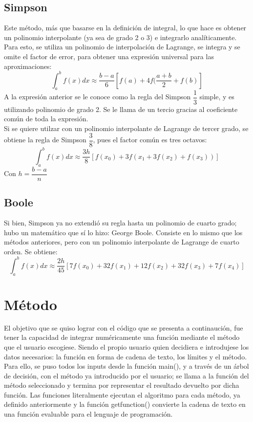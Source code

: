\documentclass[12pt,oneside,FLEQN]{report}
\begin{document}
{	\section{Simpson}
		Este método, más que basarse en la definición de integral, lo que hace es obtener un polinomio interpolante (ya sea de grado 2 o 3) e integrarlo analíticamente. Para esto, se utiliza un polinomio de interpolación de Lagrange, se integra y se omite el factor de error, para obtener una expresión universal para las aproximaciones:
		\begin{equation}
			\int_{a}^{b}f(x)dx\approx\dfrac{b-a}{6}\left[f(a)+4f(\dfrac{a+b}{2}+f(b)\right]
		\end{equation}
		A la expresión anterior se le conoce como la regla del Simpson $\dfrac{1}{3}$ simple, y es utilizando polinomio de grado 2. Se le llama de un tercio gracias al coeficiente común de toda la expresión.\\

		Si se quiere utilzar con un polinomio interpolante de Lagrange de tercer grado, se obtiene la regla de Simpson $\dfrac{3}{8}$, pues el factor común es tres octavos:
		\begin{equation}
			\int_{a}^{b}f(x)dx\approx\dfrac{3h}{8}\left[f(x_{0})+3f(x_{1}+3f(x_{2})+f(x_{3}))\right]
		\end{equation}
		Con $h=\dfrac{b-a}{n}$ 
	\section{Boole}
		Si bien, Simpson ya no extendió su regla hasta un polinomio de cuarto grado; hubo un matemático que sí lo hizo: George Boole. Consiste en lo mismo que los métodos anteriores, pero con un polinomio interpolante de Lagrange de cuarto orden. Se obtiene:
		\begin{equation}
			\int_{a}^{b}f(x)dx\approx\dfrac{2h}{45}\left[7f(x_{0})+32f(x_{1})+12f(x_{2})+32f(x_{3})+7f(x_{4})\right]
		\end{equation}

\chapter{Método}
	El objetivo que se quiso lograr con el código que se presenta a continaución, fue tener la capacidad de integrar numéricamente una función mediante el método que el usuario escogiese. Siendo el propio usuario quien decidiera e introdujese los datos necesarios: la función en forma de cadena de texto, los límites y el método. Para ello, se puso todos los inputs desde la función main(), y a través de un árbol de decisión, con el método ya introducido por el usuario; se llama a la función del método seleccionado y termina por representar el resultado devuelto por dicha función. Las funciones literalmente ejecutan el algoritmo para cada método, ya definido anteriormente y la función getfunction() convierte la cadena de texto en una función evaluable para el lenguaje de programación.
}
\end{document}
